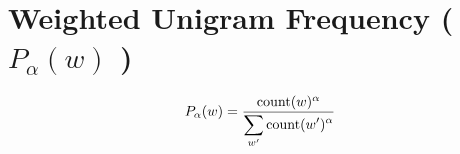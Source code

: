 \section{Weighted Unigram Frequency ( $P_\alpha(w)$ )}\label{Weighted Unigram Frequency (p alpha)}

\[
    P_\alpha(w) = \dfrac{\operatorname{count}(w)^\alpha}{\displaystyle\sum_{w'} \operatorname{count}(w')^\alpha}
\]









































































